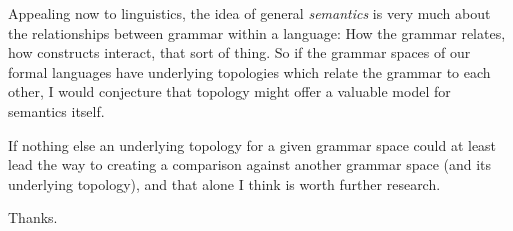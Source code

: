 \documentclass[twoside]{article}
\begin{document}
Appealing now to linguistics, the idea of general \emph{semantics} is very much about the relationships between
grammar within a language: How the grammar relates, how constructs interact, that sort of thing. So if the
grammar spaces of our formal languages have underlying topologies which relate the grammar to each other,
I would conjecture that topology might offer a valuable model for semantics itself.

If nothing else an underlying topology for a given grammar space could at least lead the way to creating a comparison
against another grammar space (and its underlying topology), and that alone I think is worth further research.

Thanks.
\end{document}
